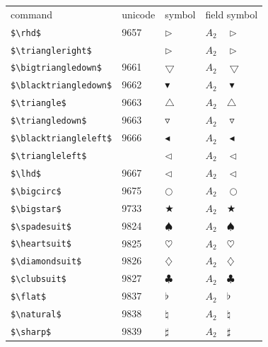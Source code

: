 ﻿\documentclass{article}
\begin{document}
\begin{table}
\begin{center}
\begin{tabular}{llll}
 command                      & unicode & symbol                & field symbol\\
 \verb#$\rhd$#                & 9657    & $\rhd$                & $A_2\quad \rhd$\\
 \verb#$\triangleright$#      &         & $\triangleright$      & $A_2\quad \triangleright$\\
 \verb#$\bigtriangledown$#    & 9661    & $\bigtriangledown$    & $A_2\quad \bigtriangledown$\\
 \verb#$\blacktriangledown$#  & 9662    & $\blacktriangledown$  & $A_2\quad \blacktriangledown$\\
 \verb#$\triangle$#           & 9663    & $\triangle$           & $A_2\quad \triangle$\\
 \verb#$\triangledown$#       & 9663    & $\triangledown$       & $A_2\quad \triangledown$\\
 \verb#$\blacktriangleleft$#  & 9666    & $\blacktriangleleft$  & $A_2\quad \blacktriangleleft$\\
 \verb#$\triangleleft$#       &         & $\triangleleft$       & $A_2\quad \triangleleft$\\
 \verb#$\lhd$#                & 9667    & $\lhd$                & $A_2\quad \lhd$\\
 \verb#$\bigcirc$#            & 9675    & $\bigcirc$            & $A_2\quad \bigcirc$\\
 \verb#$\bigstar$#            & 9733    & $\bigstar$            & $A_2\quad \bigstar$\\
 \verb#$\spadesuit$#          & 9824    & $\spadesuit$          & $A_2\quad \spadesuit$\\
 \verb#$\heartsuit$#          & 9825    & $\heartsuit$          & $A_2\quad \heartsuit$\\
 \verb#$\diamondsuit$#        & 9826    & $\diamondsuit$        & $A_2\quad \diamondsuit$\\
 \verb#$\clubsuit$#           & 9827    & $\clubsuit$           & $A_2\quad \clubsuit$\\
 \verb#$\flat$#               & 9837    & $\flat$               & $A_2\quad \flat$\\
 \verb#$\natural$#            & 9838    & $\natural$            & $A_2\quad \natural$\\
 \verb#$\sharp$#              & 9839    & $\sharp$              & $A_2\quad \sharp$\\

\end{tabular}
\end{center}
\end{table}
\end{document}
